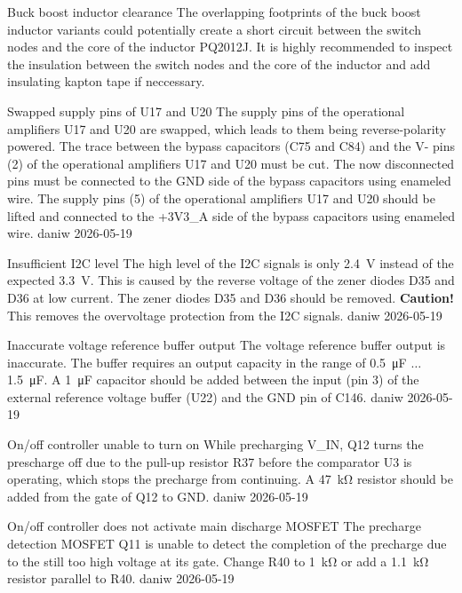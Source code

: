 \begin{ModTable}

\ModItemOpen
{Buck boost inductor clearance}
{The overlapping footprints of the buck boost inductor variants could potentially create a short circuit between the switch nodes and the core of the inductor PQ2012J. }
{It is highly recommended to inspect the insulation between the switch nodes and the core of the inductor and add insulating kapton tape if neccessary. }
{}
{}

\ModItemDone
{Swapped supply pins of U17 and U20}
{The supply pins of the operational amplifiers U17 and U20 are swapped, which leads to them being reverse-polarity powered. }
{The trace between the bypass capacitors (C75 and C84) and the V- pins (2) of the operational amplifiers U17 and U20 must be cut. The now disconnected pins must be connected to the GND side of the bypass capacitors using enameled wire. \newline The supply pins (5) of the operational amplifiers U17 and U20 should be lifted and connected to the +3V3\_A side of the bypass capacitors using enameled wire. }
{daniw}
{2026-05-19}

\ModItemDone
{Insufficient \ac{I2C} level}
{The high level of the \ac{I2C} signals is only \qty{2.4}{\volt} instead of the expected \qty{3.3}{\volt}. \newline This is caused by the reverse voltage of the zener diodes D35 and D36 at low current. }
{The zener diodes D35 and D36 should be removed. \newline \textbf{Caution!} This removes the overvoltage protection from the \ac{I2C} signals. }
{daniw}
{2026-05-19}

\ModItemDone
{Inaccurate voltage reference buffer output}
{The voltage reference buffer output is inaccurate. The buffer requires an output capacity in the range of \qty{0.5}{\micro\farad} $\ldots$ \qty{1.5}{\micro\farad}. }
{A \qty{1}{\micro\farad} capacitor should be added between the input (pin 3) of the external reference voltage buffer (U22) and the GND pin of C146. }
{daniw}
{2026-05-19}

\ModItemDone
{On/off controller unable to turn on}
{While precharging V\_IN, Q12 turns the prescharge off due to the pull-up resistor R37 before the comparator U3 is operating, which stops the precharge from continuing. }
{A \qty{47}{\kilo\ohm} resistor should be added from the gate of Q12 to GND. }
{daniw}
{2026-05-19}

\ModItemDone
{On/off controller does not activate main discharge MOSFET}
{The precharge detection MOSFET Q11 is unable to detect the completion of the precharge due to the still too high voltage at its gate. }
{Change R40 to \qty{1}{\kilo\ohm} or add a \qty{1.1}{\kilo\ohm} resistor parallel to R40. }
{daniw}
{2026-05-19}


\end{ModTable}
